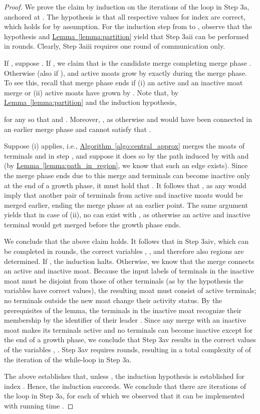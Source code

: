 \documentclass[letterpaper,11pt]{article}
\newcommand{\namedref}[2]{\hyperref[#2]{#1~\ref*{#2}}}
\newcommand{\lemmaref}[1]{\namedref{Lemma}{#1}}
\newcommand{\algref}[1]{\namedref{Algorithm}{#1}}
\begin{document}
\begin{proof}
We prove the claim by induction on the iterations  of the loop in Step 3a, anchored at . The
hypothesis is that all respective values for index  are correct, which holds
for  by assumption. For the induction step from  to , observe
that the hypothesis and \lemmaref{lemma:partition} yield that Step 3aii can be
performed in  rounds. Clearly, Step 3aiii requires one round of
communication only.

If , suppose
. If , we claim that  is the candidate merge
completing merge phase . Otherwise (also if ),  and
active moats grow by exactly  during the
merge phase. To see this, recall that merge phase  ends if (i) an active and
an inactive moat merge or (ii) active moats have grown by
. Note that, by
\lemmaref{lemma:partition} and the induction hypothesis,

for any  so that  and
. Moreover, , as otherwise  and  would have been connected
in an earlier merge phase and cannot satisfy that .

Suppose (i) applies, i.e., \algref{algo:central_approx} merges the moats of
terminals  and  in step , and suppose it does so by the
path  induced by  with 
and  (by \lemmaref{lemma:path_in_region}, we know that
such an edge exists). Since the merge phase ends due to this merge and terminals
can become inactive only at the end of a growth phase, it must hold that
. It follows that
, as any  would imply that another pair of terminals
from active and inactive moats would be merged earlier, ending the merge phase
at an earlier point. The same argument yields that in case of (ii), no
 can exist with
, as otherwise an active and
inactive terminal would get merged before the growth phase ends.

We conclude that the above claim holds. It follows that in Step 3aiv, which can
be completed in  rounds, the correct variables
, , and therefore also regions  are
determined. If , the induction halts. Otherwise, we know that the
merge  connects an active and inactive moat. Because the input labels of
terminals in the inactive moat must be disjoint from those of other terminals
(as by the hypothesis the variables  have correct values), the resulting
moat must consist of active terminals; no terminals outside the new moat change
their activity status. By the prerequisites of the lemma, the terminals in the
inactive moat  recognize their membership by the identifier of their leader
. Since any merge with an inactive moat makes its terminals active and no
terminals can become inactive except for the end of a growth phase, we conclude
that Step 3av results in the correct values of the variables ,
. Step 3av requires  rounds, resulting in a total
complexity of  of the iteration of the while-loop in Step 3a.

The above establishes that, unless , the induction hypothesis is
established for index . Hence, the induction succeeds. We conclude that
there are  iterations of the loop in Step 3a, for each of which
we observed that it can be implemented with running time .
\end{proof}
\end{document}
